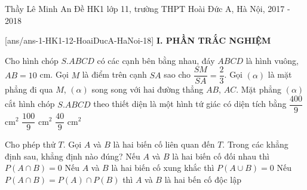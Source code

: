 	\begin{name}
		{Thầy Lê Minh An}
		{Đề HK1 lớp 11, trường THPT Hoài Đức A, Hà Nội, 2017 - 2018}
	\end{name}
	\setcounter{ex}{0}\setcounter{bt}{0}
	[ans/ans-1-HK1-12-HoaiDucA-HaNoi-18]
\noindent\textbf{I. PHẦN TRẮC NGHIỆM}
\begin{ex}%
Cho hình chóp $S.ABCD$ có các cạnh bên bằng nhau, đáy $ABCD$ là hình vuông, $AB=10$ cm. Gọi $M$ là điểm trên cạnh $SA$ sao cho $\dfrac{SM}{SA}=\dfrac{2}{3}$. Gọi $(\alpha)$ là mặt phẳng đi qua $M$, $(\alpha)$ song song với hai đường thẳng $AB$, $AC$. Mặt phẳng $(\alpha)$ cắt hình chóp $S.ABCD$ theo thiết diện là một hình tứ giác có diện tích bằng
{\True $\dfrac{400}{9}$ cm$^2$}
{$\dfrac{100}{9}$ cm$^2$}
{$\dfrac{40}{9}$ cm$^2$}
\end{ex}

\begin{ex}%
Cho phép thử $T$. Gọi $A$ và $B$ là hai biến cố liên quan đến $T$. Trong các khẳng định sau, khẳng định nào đúng?
{\True Nếu $A$ và $B$ là hai biến cố đối nhau thì $P(A\cap B)=0$}
{Nếu $A$ và $B$ là hai biến cố xung khắc thì $P(A\cup B)=0$}
{Nếu $P(A\cap B)=P(A)\cap P(B)$ thì $A$ và $B$ là hai bến cố độc lập}
\end{ex}

